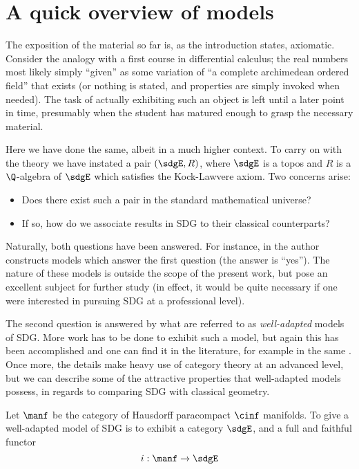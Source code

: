 \chapter{A quick overview of models}

The exposition of the material so far is, as the introduction states, axiomatic. Consider the analogy with a first course in differential calculus; the real numbers most likely simply ``given'' as some variation of ``a complete archimedean ordered field'' that exists (or nothing is stated, and properties are simply invoked when needed). The task of actually exhibiting such an object is left until a later point in time, presumably when the student has matured enough to grasp the necessary material.

Here we have done the same, albeit in a much higher context. To carry on with the theory we have instated a pair \( (\sdgE,R) \), where \( \sdgE \) is a topos and \( R \) is a \( \Q \)-algebra of \( \sdgE \) which satisfies the Kock-Lawvere axiom. Two concerns arise:
\begin{itemize}
  \item Does there exist such a pair in the standard mathematical universe?
  \item If so, how do we associate results in SDG to their classical counterparts?
\end{itemize}

Naturally, both questions have been answered. For instance, in \cite[§III]{kock06} the author constructs models which answer the first question (the answer is ``yes''). The nature of these models is outside the scope of the present work, but pose an excellent subject for further study (in effect, it would be quite necessary if one were interested in pursuing SDG at a professional level).

The second question is answered by what are referred to as \emph{well-adapted} models of SDG. More work has to be done to exhibit such a model, but again this has been accomplished and one can find it in the literature, for example in the same \cite{kock06}. Once more, the details make heavy use of category theory at an advanced level, but we can describe some of the attractive properties that well-adapted models possess, in regards to comparing SDG with classical geometry.

Let \( \manf \) be the category of Hausdorff paracompact \( \cinf \) manifolds. To give a well-adapted model of SDG is to exhibit a category \( \sdgE \), and a full and faithful functor
\begin{equation*}
  i:\manf\to\sdgE
\end{equation*}

